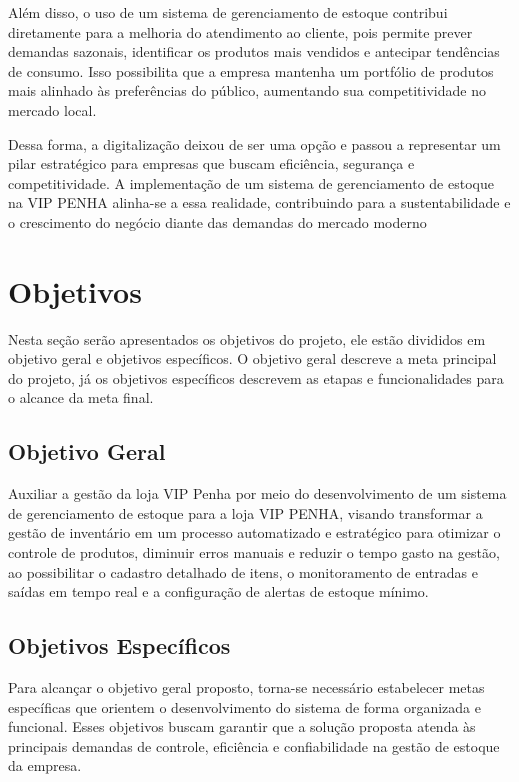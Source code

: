 \documentclass[
	12pt,				%
	openany,			%
	twoside,			%
	a4paper,			%
	english,			%
	brazil				%
	]{abntex2}
\begin{document}
Além disso, o uso de um sistema de gerenciamento de estoque contribui diretamente para a melhoria do atendimento ao cliente, pois permite prever demandas sazonais, identificar os produtos mais vendidos e antecipar tendências de consumo. Isso possibilita que a empresa mantenha um portfólio de produtos mais alinhado às preferências do público, aumentando sua competitividade no mercado local. 

Dessa forma, a digitalização deixou de ser uma opção e passou a representar um pilar estratégico para empresas que buscam eficiência, segurança e competitividade. A implementação de um sistema de gerenciamento de estoque na VIP PENHA alinha-se a essa realidade, contribuindo para a sustentabilidade e o crescimento do negócio diante das demandas do mercado moderno

\section{Objetivos}

Nesta seção serão apresentados os objetivos do projeto, ele estão divididos em objetivo geral e objetivos específicos. O objetivo geral descreve a meta principal do projeto, já os objetivos específicos descrevem as etapas e funcionalidades para o alcance da meta final.

\subsection{Objetivo Geral}

Auxiliar a gestão da loja VIP Penha por meio do desenvolvimento de um sistema de gerenciamento de estoque para a loja VIP PENHA, visando transformar a gestão de inventário em um processo automatizado e estratégico para otimizar o controle de produtos, diminuir erros manuais e reduzir o tempo gasto na gestão, ao possibilitar o cadastro detalhado de itens, o monitoramento de entradas e saídas em tempo real e a configuração de alertas de estoque mínimo. 

\subsection{Objetivos Específicos}

Para alcançar o objetivo geral proposto, torna-se necessário estabelecer metas específicas que orientem o desenvolvimento do sistema de forma organizada e funcional. Esses objetivos buscam garantir que a solução proposta atenda às principais demandas de controle, eficiência e confiabilidade na gestão de estoque da empresa.
\end{document}
